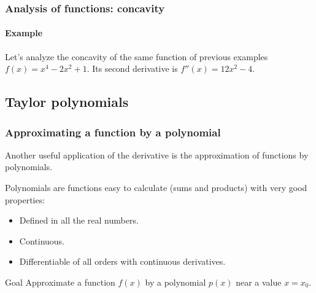 

\begin{frame}
\frametitle{Analysis of functions: concavity}
\framesubtitle{Example}
Let's analyze the concavity of the same function of previous examples $f(x)=x^4-2x^2+1$. 
Its second derivative is $f''(x)=12x^2-4$.
\begin{center}
\scalebox{0.9}{}
\end{center}
\end{frame}



\subsection{Taylor polynomials}
\begin{frame}
\frametitle{Approximating a function by a polynomial}
Another useful application of the derivative is the approximation of functions by polynomials.

Polynomials are functions easy to calculate (sums and products) with very good properties:
\begin{itemize}
\item Defined in all the real numbers.
\item Continuous.
\item Differentiable of all orders with continuous derivatives.
\end{itemize}

\begin{block}{Goal}
Approximate a function $f(x)$ by a polynomial $p(x)$ near a value $x=x_0$.
\end{block}
\end{frame}



